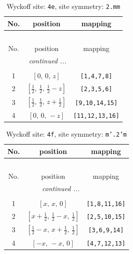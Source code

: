 \documentclass[fleqn,8pt]{jsarticle}
\begin{document}
\renewcommand{\arraystretch}{1.2}
\begin{longtable}{ccc}
\caption{Wyckoff site: {\tt 4e}, site symmetry: {\tt 2.mm}}
 \\
 \hline \hline
No. & position & mapping \\ \hline \endfirsthead

\multicolumn{2}{l}{\tablename\ \thetable{}} \\
 \hline \hline
No. & position & mapping \\ \hline \endhead

 \hline \hline
\multicolumn{2}{r}{\footnotesize\it continued ...} \\ \endfoot

 \hline \hline
\multicolumn{2}{r}{} \\ \endlastfoot

1 & $\left[ 0,\, 0,\, z \right]$ & {\tt [1,4,7,8]} \\ \hline
2 & $\left[ \frac{1}{2},\, \frac{1}{2},\, \frac{1}{2} - z \right]$ & {\tt [2,3,5,6]} \\ \hline
3 & $\left[ \frac{1}{2},\, \frac{1}{2},\, z + \frac{1}{2} \right]$ & {\tt [9,10,14,15]} \\ \hline
4 & $\left[ 0,\, 0,\, - z \right]$ & {\tt [11,12,13,16]} \\
\end{longtable}
\renewcommand{\arraystretch}{1.2}
\begin{longtable}{ccc}
\caption{Wyckoff site: {\tt 4f}, site symmetry: {\tt m'.2'm}}
 \\
 \hline \hline
No. & position & mapping \\ \hline \endfirsthead

\multicolumn{2}{l}{\tablename\ \thetable{}} \\
 \hline \hline
No. & position & mapping \\ \hline \endhead

 \hline \hline
\multicolumn{2}{r}{\footnotesize\it continued ...} \\ \endfoot

 \hline \hline
\multicolumn{2}{r}{} \\ \endlastfoot

1 & $\left[ x,\, x,\, 0 \right]$ & {\tt [1,8,11,16]} \\ \hline
2 & $\left[ x + \frac{1}{2},\, \frac{1}{2} - x,\, \frac{1}{2} \right]$ & {\tt [2,5,10,15]} \\ \hline
3 & $\left[ \frac{1}{2} - x,\, x + \frac{1}{2},\, \frac{1}{2} \right]$ & {\tt [3,6,9,14]} \\ \hline
4 & $\left[ - x,\, - x,\, 0 \right]$ & {\tt [4,7,12,13]} \\
\end{longtable}
\end{document}
